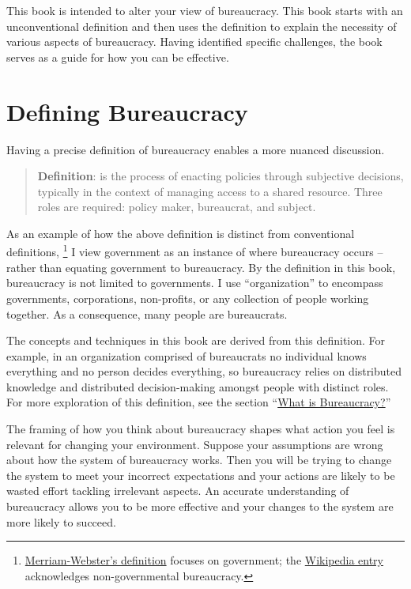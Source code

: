 This book is intended to alter your view of bureaucracy. This book starts with an unconventional definition and then uses the definition to explain the necessity of various aspects of bureaucracy. Having identified specific challenges, the book serves as a guide for how you can be effective. 

\section*{Defining Bureaucracy}

Having a precise definition of bureaucracy enables a more nuanced discussion.\nolinebreak 
\begin{quote}
\textbf{Definition}: 
\iftoggle{glossarysubstitutionworks}{\Gls{bureaucracy}}{Bureaucracy}
is the process of enacting policies through subjective decisions, typically in the context of managing access to a shared resource. Three roles are required: policy maker, bureaucrat, and subject.
\end{quote}


As an example of how the above definition is distinct from conventional definitions,%
\footnote{\href{https://www.merriam-webster.com/dictionary/bureaucracy}{Merriam-Webster's definition} focuses on government; the \href{https://en.wikipedia.org/wiki/Bureaucracy}{Wikipedia entry}
acknowledges non-governmental bureaucracy.} I view government as an instance of where bureaucracy occurs -- rather than equating government to bureaucracy. By the definition in this book, bureaucracy is not limited to governments. I use ``organization'' to encompass governments, corporations, non-profits, or any collection of people working together. As a consequence, many people are bureaucrats. 


The concepts and techniques in this book are derived from this definition. For example, in an organization comprised of bureaucrats no individual knows everything and no person decides everything, so bureaucracy relies on distributed knowledge and distributed decision-making amongst people with distinct roles.
For more exploration of this definition, see the section ``\hyperref[sec:define-bureaucracy]{What is Bureaucracy?}''%
\iftoggle{haspagenumbers}{ on page~\pageref{sec:define-bureaucracy}.}{ }%


The framing of how you think about bureaucracy shapes what action you feel is relevant for changing your environment. 
Suppose your assumptions are wrong about how the system of bureaucracy works. Then you will be trying to change the system to meet your incorrect expectations and your actions are likely to be wasted effort tackling irrelevant aspects. 
An accurate understanding of bureaucracy allows you to be more effective and your changes to the system are more likely to succeed. 


